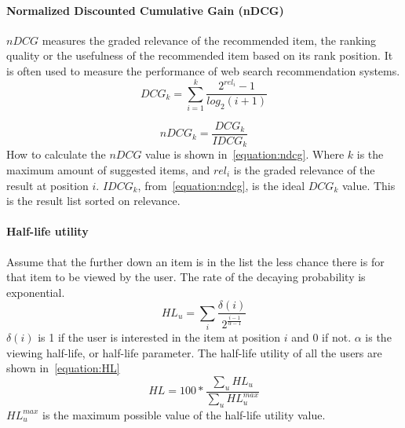 \paragraph{Normalized Discounted Cumulative Gain (nDCG)}
\label{subp:normalized_discounted_cumulative_gain_}
$nDCG$ measures the graded relevance of the recommended item, the ranking quality or the usefulness of the recommended item based on its rank position.
It is often used to measure the performance of web search recommendation systems.
\begin{equation}
    DCG_k = \sum_{i=1}^{k}{\frac{2^{rel_i}-1}{log_2(i+1)}}
    \label{equation:dcg}
\end{equation}

\begin{equation}
    nDCG_k = \frac{DCG_k}{IDCG_k}
    \label{equation:ndcg}
\end{equation}
How to calculate the $nDCG$ value is shown in~\ref{equation:ndcg}.
Where $k$ is the maximum amount of suggested items, and $rel_i$ is the graded relevance of the result at position $i$.
$IDCG_k$, from~\ref{equation:ndcg}, is the ideal $DCG_k$ value.
This is the result list sorted on relevance.

\paragraph{Half-life utility~\cite{Breese:1998:EAP:2074094.2074100}}
Assume that the further down an item is in the list the less chance there is for that item to be viewed by the user.
The rate of the decaying probability is exponential.
\begin{equation}
	HL_u = \sum_{i}{\frac{\delta(i)}{2^{\frac{i-1}{\alpha-1}}}}
\end{equation}
$\delta(i)$ is 1 if the user is interested in the item at position $i$ and 0 if not.
$\alpha$ is the viewing half-life, or half-life parameter.
The half-life utility of all the users are shown in~\ref{equation:HL}
\begin{equation}
	HL = 100 * \frac{\sum_u{HL_u}}{\sum_u{HL_u^{max}}}
	\label{equation:HL}
\end{equation}
$HL_u^{max}$ is the maximum possible value of the half-life utility value.

